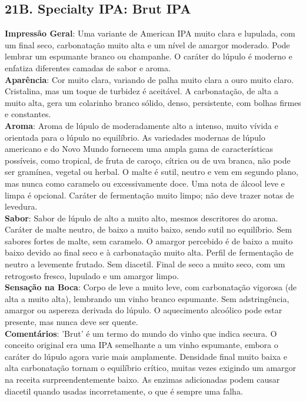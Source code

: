 \subsection*{21B. Specialty IPA: Brut IPA}
\textbf{Impressão Geral}: Uma variante de American IPA muito clara e lupulada, com um final seco, carbonatação muito alta e um nível de amargor moderado. Pode lembrar um espumante branco ou champanhe. O caráter do lúpulo é moderno e enfatiza diferentes camadas de sabor e aroma. \\
\textbf{Aparência}: Cor muito clara, variando de palha muito clara a ouro muito claro. Cristalina, mas um toque de turbidez é aceitável. A carbonatação, de alta a muito alta, gera um colarinho branco sólido, denso, persistente, com bolhas firmes e constantes. \\
\textbf{Aroma}: Aroma de lúpulo de moderadamente alto a intenso, muito vívida e orientada para o lúpulo no equilíbrio. As variedades modernas de lúpulo americano e do Novo Mundo fornecem uma ampla gama de características possíveis, como tropical, de fruta de caroço, cítrica ou de uva branca, não pode ser gramínea, vegetal ou herbal. O malte é sutil, neutro e vem em segundo plano, mas nunca como caramelo ou excessivamente doce. Uma nota de álcool leve e limpa é opcional. Caráter de fermentação muito limpo; não deve trazer notas de levedura. \\
\textbf{Sabor}: Sabor de lúpulo de alto a muito alto, mesmos descritores do aroma. Caráter de malte neutro, de baixo a muito baixo, sendo sutil no equilíbrio. Sem sabores fortes de malte, sem caramelo. O amargor percebido é de baixo a muito baixo devido ao final seco e à carbonatação muito alta. Perfil de fermentação de neutro a levemente frutado. Sem diacetil. Final de seco a muito seco, com um retrogosto fresco, lupulado e um amargor limpo. \\
\textbf{Sensação na Boca}: Corpo de leve a muito leve, com carbonatação vigorosa (de alta a muito alta), lembrando um vinho branco espumante. Sem adstringência, amargor ou aspereza derivada do lúpulo. O aquecimento alcoólico pode estar presente, mas nunca deve ser quente. \\
\textbf{Comentários}: 'Brut' é um termo do mundo do vinho que indica secura. O conceito original era uma IPA semelhante a um vinho espumante, embora o caráter do lúpulo agora varie mais amplamente. Densidade final muito baixa e alta carbonatação tornam o equilíbrio crítico, muitas vezes exigindo um amargor na receita surpreendentemente baixo. As enzimas adicionadas podem causar diacetil quando usadas incorretamente, o que é sempre uma falha. \\
